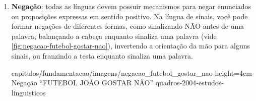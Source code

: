 \begin{enumerate}
\begin{enumerate}
    \end{enumerate}
    
    \item \textbf{Negação}: todas as línguas devem possuir mecanismos para negar enunciados ou proposições expressas em sentido positivo. Na língua de sinais, você pode formar negações de diferentes formas, como sinalizando NÃO antes de uma palavra, balançando a cabeça enquanto sinaliza uma palavra (vide \autoref{fig:negacao-futebol-gostar-nao}), invertendo a orientação da mão para alguns sinais, ou franzindo a testa enquanto sinaliza uma palavra.
    

    
        {capitulos/fundamentacao/imagens/negacao_futebol_gostar_nao} %
        {height=4cm} %
        {Negação ``FUTEBOL JOÃO GOSTAR NÃO''} %
        {quadros-2004-estudos-linguisticos} %


\end{enumerate}








